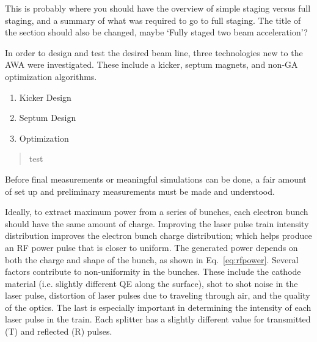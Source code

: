 \documentclass{iitthesis}
\newcommand{\lsnote}[1]{\textsf{{\color{violet}{ LS note:}   #1 }}}
\begin{document}


 \label{sec:requirements}

\lsnote{This is probably where you should have the overview of simple staging versus full staging, and a summary of what was required to go to full staging.  The title of the section should also be changed, maybe `Fully staged two beam acceleration'?}

In order to design and test the desired beam line, three technologies 
new to the AWA were investigated. These include a kicker, septum magnets, 
and non-GA optimization algorithms.

\begin{enumerate}
	\item Kicker Design
	\item Septum Design
	\item Optimization 
\end{enumerate}

\begin{quotation}
	test
\end{quotation}

\clearpage


Before final measurements or meaningful simulations can be done, 
a fair amount of set up and preliminary measurements 
must be made and understood. 

 \label{sec:uvoptics}

Ideally, to extract maximum power from a series of bunches, each electron bunch should have the same amount of charge.  Improving the laser pulse train intensity distribution improves the electron bunch charge distribution; 
which  helps produce an RF power pulse that is closer to uniform. 
The generated power depends on both the charge and shape of the bunch, as shown in Eq.~\ref{eq:rfpower}. 
Several factors contribute to non-uniformity in the bunches. These include the cathode material
(i.e. slightly different QE along the surface), shot to shot noise in the laser pulse, 
distortion of laser pulses due to traveling through air, and the quality of the optics. 
The last is especially important in determining the intensity of each laser pulse in the train.  
Each splitter has a slightly different value for transmitted (T) and reflected (R) pulses. 
\end{document}
